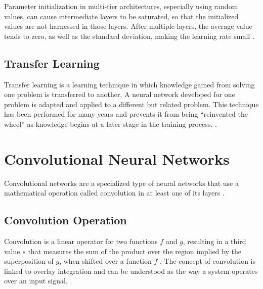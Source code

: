 Parameter initialization in multi-tier architectures, especially using random values, can cause intermediate layers to be saturated, so that the initialized values are not harnessed in those layers.
After multiple layers, the average value tends to zero, as well as the standard deviation, making the learning rate small \cite{Glorot2010a:PMLR}.

\subsection{Transfer Learning}
\label{cap2_transfer_learning}

Transfer learning is a learning technique in which knowledge gained from solving one problem is transferred to another. 
A neural network developed for one problem is adapted and applied to a different but related problem.
This technique has been performed for many years and prevents it from being ``reinvented the wheel'' as knowledge begins at a later stage in the training process. \cite{Pratt:1992:NIPS1992_641} \cite{Weiss:2016:JOURN_BIG_DATA}.

\section{Convolutional Neural Networks}
\label{cap2_nn_convolucionais}

Convolutional networks are a specialized type of neural networks that use a mathematical operation called convolution in at least one of its layers \cite[Ch. 9]{Goodfellow2016}.

\subsection{Convolution Operation}
\label{cap2_convolucao}

Convolution is a linear operator for two functions $f$ and $g$, resulting in a third value $s$ that measures the sum of the product over the region implied by the superposition of $g$, when shifted over a function $f$ \cite{ConvolutionMathWorld:2018}. 
The concept of convolution is linked to overlay integration and can be understood as the way a system operates over an input signal. \cite[Ch.~6]{Smith:1997:SEG:281875}.

